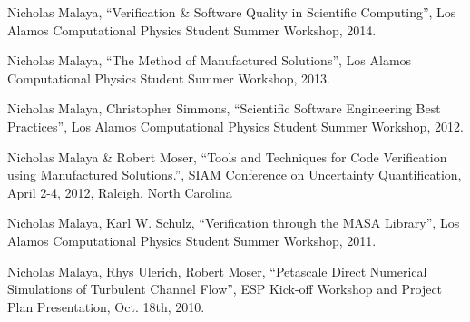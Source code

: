 
Nicholas Malaya, ``Verification \& Software Quality in Scientific
      Computing'', Los Alamos Computational Physics Student Summer
      Workshop, 2014. 

\blankline

Nicholas Malaya, ``The Method of Manufactured Solutions'', Los Alamos
      Computational Physics Student Summer Workshop, 2013.

\blankline

Nicholas Malaya, Christopher Simmons, ``Scientific Software Engineering
      Best Practices'', Los Alamos Computational Physics Student Summer
      Workshop, 2012.

\blankline

Nicholas Malaya \& Robert Moser, ``Tools and Techniques for Code
Verification using Manufactured Solutions.'', SIAM Conference on
Uncertainty Quantification, April 2-4, 2012, Raleigh, North Carolina 

\blankline

Nicholas Malaya, Karl W. Schulz, ``Verification through the MASA
      Library'', Los Alamos Computational Physics Student Summer
      Workshop, 2011.

\blankline

Nicholas Malaya, Rhys Ulerich, Robert Moser, ``Petascale Direct
Numerical Simulations of Turbulent Channel Flow'', ESP Kick-off
Workshop and Project Plan Presentation, Oct. 18th, 2010.



